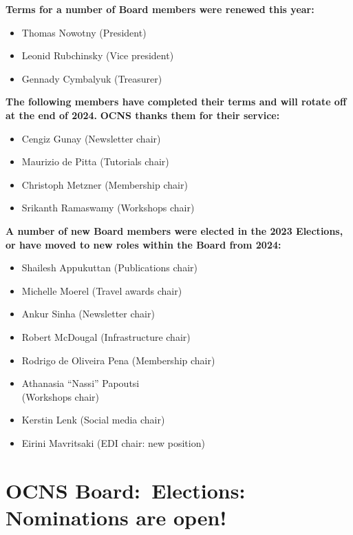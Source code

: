 \documentclass[11pt,a4paper,oneside]{article}
\begin{document}
\textbf{Terms for a number of Board members were renewed this year:}
\begin{multicols}{2}
  \begin{itemize}
    \item Thomas Nowotny (President)
    \item Leonid Rubchinsky (Vice president)
    \item Gennady Cymbalyuk (Treasurer)
  \end{itemize}
\end{multicols}
\clearpage
\textbf{The following members have completed their terms and will rotate off at the end of 2024.}
\textbf{OCNS thanks them for their service:}
\begin{multicols}{2}
  \begin{itemize}
    \item Cengiz Gunay (Newsletter chair)
    \item Maurizio de Pitta (Tutorials chair)
    \item Christoph Metzner (Membership chair)
    \item Srikanth Ramaswamy (Workshops chair)
  \end{itemize}
\end{multicols}

\textbf{A number of new Board members were elected in the 2023 Elections, or have moved to new roles within the Board from 2024:}
\begin{multicols}{2}
  \begin{itemize}
    \item Shailesh Appukuttan (Publications chair)
    \item Michelle Moerel (Travel awards chair)
    \item Ankur Sinha (Newsletter chair)
    \item Robert McDougal (Infrastructure chair)
    \item Rodrigo de Oliveira Pena (Membership chair)
    \item Athanasia \enquote{Nassi} Papoutsi\\(Workshops chair)
    \item Kerstin Lenk (Social media chair)
    \item Eirini Mavritsaki (EDI chair: new position)
  \end{itemize}
\end{multicols}

\section*{OCNS Board:\ Elections: Nominations are open!}%
%
\end{document}
